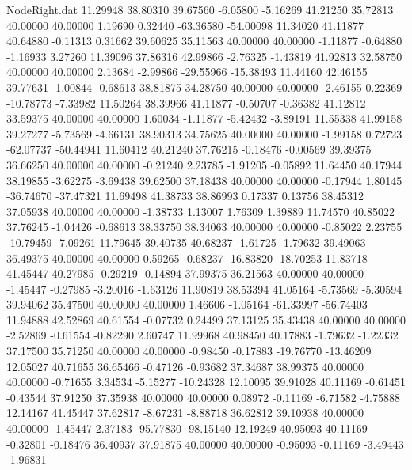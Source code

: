 \begin{filecontents}{NodeRight.dat}
  11.29948   38.80310   39.67560    -6.05800   -5.16269   41.21250   35.72813   40.00000   40.00000    1.19690    0.32440  -63.36580  -54.00098
  11.34020   41.11877   40.64880    -0.11313    0.31662   39.60625   35.11563   40.00000   40.00000   -1.11877   -0.64880   -1.16933    3.27260
  11.39096   37.86316   42.99866    -2.76325   -1.43819   41.92813   32.58750   40.00000   40.00000    2.13684   -2.99866  -29.55966  -15.38493
  11.44160   42.46155   39.77631    -1.00844   -0.68613   38.81875   34.28750   40.00000   40.00000   -2.46155    0.22369  -10.78773   -7.33982
  11.50264   38.39966   41.11877    -0.50707   -0.36382   41.12812   33.59375   40.00000   40.00000    1.60034   -1.11877   -5.42432   -3.89191
  11.55338   41.99158   39.27277    -5.73569   -4.66131   38.90313   34.75625   40.00000   40.00000   -1.99158    0.72723  -62.07737  -50.44941
  11.60412   40.21240   37.76215    -0.18476   -0.00569   39.39375   36.66250   40.00000   40.00000   -0.21240    2.23785   -1.91205   -0.05892
  11.64450   40.17944   38.19855    -3.62275   -3.69438   39.62500   37.18438   40.00000   40.00000   -0.17944    1.80145  -36.74670  -37.47321
  11.69498   41.38733   38.86993     0.17337    0.13756   38.45312   37.05938   40.00000   40.00000   -1.38733    1.13007    1.76309    1.39889
  11.74570   40.85022   37.76245    -1.04426   -0.68613   38.33750   38.34063   40.00000   40.00000   -0.85022    2.23755  -10.79459   -7.09261
  11.79645   39.40735   40.68237    -1.61725   -1.79632   39.49063   36.49375   40.00000   40.00000    0.59265   -0.68237  -16.83820  -18.70253
  11.83718   41.45447   40.27985    -0.29219   -0.14894   37.99375   36.21563   40.00000   40.00000   -1.45447   -0.27985   -3.20016   -1.63126
  11.90819   38.53394   41.05164    -5.73569   -5.30594   39.94062   35.47500   40.00000   40.00000    1.46606   -1.05164  -61.33997  -56.74403
  11.94888   42.52869   40.61554    -0.07732    0.24499   37.13125   35.43438   40.00000   40.00000   -2.52869   -0.61554   -0.82290    2.60747
  11.99968   40.98450   40.17883    -1.79632   -1.22332   37.17500   35.71250   40.00000   40.00000   -0.98450   -0.17883  -19.76770  -13.46209
  12.05027   40.71655   36.65466    -0.47126   -0.93682   37.34687   38.99375   40.00000   40.00000   -0.71655    3.34534   -5.15277  -10.24328
  12.10095   39.91028   40.11169    -0.61451   -0.43544   37.91250   37.35938   40.00000   40.00000    0.08972   -0.11169   -6.71582   -4.75888
  12.14167   41.45447   37.62817    -8.67231   -8.88718   36.62812   39.10938   40.00000   40.00000   -1.45447    2.37183  -95.77830  -98.15140
  12.19249   40.95093   40.11169    -0.32801   -0.18476   36.40937   37.91875   40.00000   40.00000   -0.95093   -0.11169   -3.49443   -1.96831

\end{filecontents}
